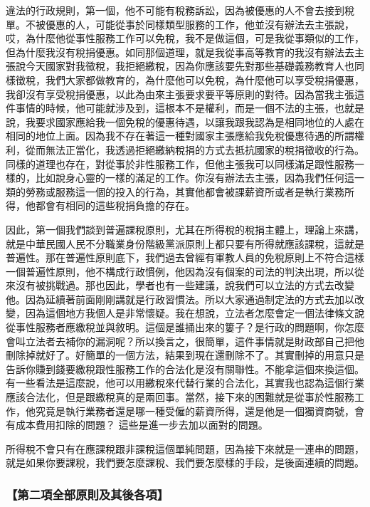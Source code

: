 \documentclass[oneside,sub3section]{ctexbook}
\begin{document}
違法的行政規則，第一個，他不可能有稅務訴訟，因為被優惠的人不會去接到稅單。不被優惠的人，可能從事於同樣類型服務的工作，他並沒有辦法去主張說，哎，為什麼他從事性服務工作可以免稅，我不是做這個，可是我從事類似的工作，但為什麼我沒有稅捐優惠。如同那個道理，就是我從事高等教育的我沒有辦法去主張說今天國家對我徵稅，我拒絕繳稅，因為你應該要先對那些基礎義務教育人也同樣徵稅，我們大家都做教育的，為什麼他可以免稅，為什麼他可以享受稅捐優惠，我卻沒有享受稅捐優惠，以此為由來主張要求要平等原則的對待。因為當我主張這件事情的時候，他可能就涉及到，這根本不是權利，而是一個不法的主張，也就是說，我要求國家應給我一個免稅的優惠待遇，以讓我跟我認為是相同地位的人處在相同的地位上面。因為我不存在著這一種對國家主張應給我免稅優惠待遇的所謂權利，從而無法正當化，我透過拒絕繳納稅捐的方式去抵抗國家的稅捐徵收的行為。同樣的道理也存在，對從事於非性服務工作，但他主張我可以同樣滿足跟性服務一樣的，比如說身心靈的一樣的滿足的工作。你沒有辦法去主張，因為我們任何這一類的勞務或服務這一個的投入的行為，其實他都會被課薪資所或者是執行業務所得，他都會有相同的這些稅捐負擔的存在。

因此，第一個我們談到普遍課稅原則，尤其在所得稅的稅捐主體上，理論上來講，就是中華民國人民不分職業身份階級黨派原則上都只要有所得就應該課稅，這就是普遍性。那在普遍性原則底下，我們過去曾經有軍教人員的免稅原則上不符合這樣一個普遍性原則，他不構成行政慣例，他因為沒有個案的司法的判決出現，所以從來沒有被挑戰過。那也因此，學者也有一些建議，說我們可以立法的方式去改變他。因為延續著前面剛剛講就是行政習慣法。所以大家通過制定法的方式去加以改變，因為這個地方我個人是非常懷疑。我在想說，立法者怎麼會定一個法律條文說從事性服務者應繳稅並與敘明。這個是誰捅出來的簍子？是行政的問題啊，你怎麼會叫立法者去補你的漏洞呢？所以換言之，很簡單，這件事情就是財政部自己把他刪除掉就好了。好簡單的一個方法，結果到現在還刪除不了。其實刪掉的用意只是告訴你賺到錢要繳稅跟性服務工作的合法化是沒有關聯性。不能拿這個來換這個。有一些看法是這麼說，他可以用繳稅來代替行業的合法化，其實我也認為這個行業應該合法化，但是跟繳稅真的是兩回事。當然，接下來的困難就是從事於性服務工作，他究竟是執行業務者還是哪一種受僱的薪資所得，還是他是一個獨資商號，會有成本費用扣除的問題？ 這些是進一步去加以面對的問題。

所得稅不會只有在應課稅跟非課稅這個單純問題，因為接下來就是一連串的問題，就是如果你要課稅，我們要怎麼課稅、我們要怎麼樣的手段，是後面連續的問題。

\hypertarget{ux7b2cux4e8cux9805ux5168ux90e8ux539fux5247ux53caux5176ux5f8cux5404ux9805}{%
\subsubsection{【第二項全部原則及其後各項】}\label{ux7b2cux4e8cux9805ux5168ux90e8ux539fux5247ux53caux5176ux5f8cux5404ux9805}}
\end{document}
